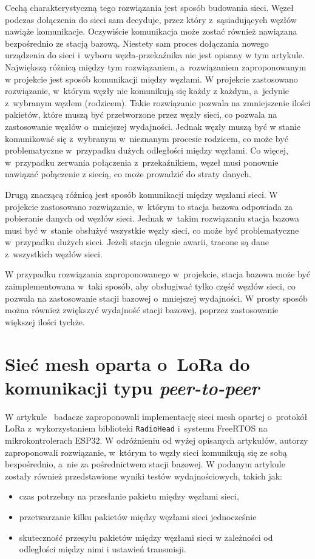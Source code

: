 Cechą charakterystyczną tego rozwiązania jest sposób budowania sieci.
Węzeł podczas dołączenia do sieci sam decyduje, przez który z~sąsiadujących węzłów nawiąże komunikacje.
Oczywiście komunikacja może zostać również nawiązana bezpośrednio ze stacją bazową.
Niestety sam proces dołączania nowego urządzenia do sieci i~wyboru węzła-przekaźnika nie jest opisany w tym artykule.
Największą różnicą między tym rozwiązaniem, a~rozwiązaniem zaproponowanym w projekcie jest sposób komunikacji między węzłami.
W projekcie zastosowano rozwiązanie, w~którym węzły nie komunikują się każdy z każdym, a~jedynie z~wybranym węzłem (rodzicem).
Takie rozwiązanie pozwala na zmniejszenie ilości pakietów, które muszą być przetworzone przez węzły sieci, co pozwala na zastosowanie węzłów o~mniejszej wydajności.
Jednak węzły muszą być w stanie komunikować się z~wybranym w~nieznanym procesie rodzicem, co może być problematyczne w~przypadku dużych odległości między węzłami.
Co więcej, w~przypadku zerwania połączenia z~przekaźnikiem, węzeł musi ponownie nawiązać połączenie z siecią, co może prowadzić do straty danych.

Drugą znaczącą różnicą jest sposób komunikacji między węzłami sieci.
W projekcie zastosowano rozwiązanie, w~którym to stacja bazowa odpowiada za pobieranie danych od węzłów sieci.
Jednak w~takim rozwiązaniu stacja bazowa musi być w~stanie obsłużyć wszystkie węzły sieci, co może być problematyczne w~przypadku dużych sieci.
Jeżeli stacja ulegnie awarii, tracone są dane z~wszystkich węzłów sieci.

W przypadku rozwiązania zaproponowanego w~projekcie, stacja bazowa może być zaimplementowana w~taki sposób, aby obsługiwać tylko część węzłów sieci, co pozwala na zastosowanie stacji bazowej o~mniejszej wydajności.
W prosty sposób można również zwiększyć wydajność stacji bazowej, poprzez zastosowanie większej ilości tychże.

\section{Sieć mesh oparta o~LoRa do komunikacji typu \emph{peer-to-peer}}
W artykule~\cite{s21134314} badacze zaproponowali implementację sieci mesh opartej o~protokół LoRa z~wykorzystaniem biblioteki \texttt{RadioHead} i~systemu FreeRTOS na mikrokontrolerach ESP32.
W odróżnieniu od wyżej opisanych artykułów, autorzy zaproponowali rozwiązanie, w~którym to węzły sieci komunikują się ze sobą bezpośrednio, a~nie za pośrednictwem stacji bazowej.
W podanym artykule zostały również przedstawione wyniki testów wydajnościowych, takich jak:
\begin{itemize}
    \item czas potrzebny na przesłanie pakietu między węzłami sieci,
    \item przetwarzanie kilku pakietów między węzłami sieci jednocześnie
    \item skuteczność przesyłu pakietów między węzłami sieci w zależności od odległości między nimi i ustawień transmisji.
\end{itemize}

